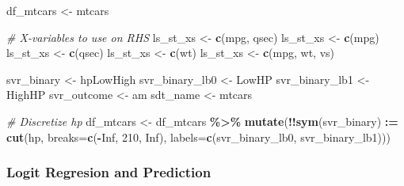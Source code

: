\documentclass[
]{book}
\newenvironment{Shaded}{\begin{snugshade}}{\end{snugshade}}
\newcommand{\CommentTok}[1]{\textcolor[rgb]{0.56,0.35,0.01}{\textit{#1}}}
\newcommand{\DataTypeTok}[1]{\textcolor[rgb]{0.13,0.29,0.53}{#1}}
\newcommand{\DecValTok}[1]{\textcolor[rgb]{0.00,0.00,0.81}{#1}}
\newcommand{\ErrorTok}[1]{\textcolor[rgb]{0.64,0.00,0.00}{\textbf{#1}}}
\newcommand{\KeywordTok}[1]{\textcolor[rgb]{0.13,0.29,0.53}{\textbf{#1}}}
\newcommand{\NormalTok}[1]{#1}
\newcommand{\OperatorTok}[1]{\textcolor[rgb]{0.81,0.36,0.00}{\textbf{#1}}}
\newcommand{\OtherTok}[1]{\textcolor[rgb]{0.56,0.35,0.01}{#1}}
\newcommand{\StringTok}[1]{\textcolor[rgb]{0.31,0.60,0.02}{#1}}
\begin{document}
\begin{Shaded}
\begin{Highlighting}[]
\NormalTok{df\_mtcars \textless{}{-}}\StringTok{ }\NormalTok{mtcars}

\CommentTok{\# X{-}variables to use on RHS}
\NormalTok{ls\_st\_xs \textless{}{-}}\StringTok{ }\KeywordTok{c}\NormalTok{(}\StringTok{\textquotesingle{}mpg\textquotesingle{}}\NormalTok{, }\StringTok{\textquotesingle{}qsec\textquotesingle{}}\NormalTok{)}
\NormalTok{ls\_st\_xs \textless{}{-}}\StringTok{ }\KeywordTok{c}\NormalTok{(}\StringTok{\textquotesingle{}mpg\textquotesingle{}}\NormalTok{)}
\NormalTok{ls\_st\_xs \textless{}{-}}\StringTok{ }\KeywordTok{c}\NormalTok{(}\StringTok{\textquotesingle{}qsec\textquotesingle{}}\NormalTok{)}
\NormalTok{ls\_st\_xs \textless{}{-}}\StringTok{ }\KeywordTok{c}\NormalTok{(}\StringTok{\textquotesingle{}wt\textquotesingle{}}\NormalTok{)}
\NormalTok{ls\_st\_xs \textless{}{-}}\StringTok{ }\KeywordTok{c}\NormalTok{(}\StringTok{\textquotesingle{}mpg\textquotesingle{}}\NormalTok{, }\StringTok{\textquotesingle{}wt\textquotesingle{}}\NormalTok{, }\StringTok{\textquotesingle{}vs\textquotesingle{}}\NormalTok{)}

\NormalTok{svr\_binary \textless{}{-}}\StringTok{ \textquotesingle{}hpLowHigh\textquotesingle{}}
\NormalTok{svr\_binary\_lb0 \textless{}{-}}\StringTok{ \textquotesingle{}LowHP\textquotesingle{}}
\NormalTok{svr\_binary\_lb1 \textless{}{-}}\StringTok{ \textquotesingle{}HighHP\textquotesingle{}}
\NormalTok{svr\_outcome \textless{}{-}}\StringTok{ \textquotesingle{}am\textquotesingle{}}
\NormalTok{sdt\_name \textless{}{-}}\StringTok{ \textquotesingle{}mtcars\textquotesingle{}}

\CommentTok{\# Discretize hp}
\NormalTok{df\_mtcars \textless{}{-}}\StringTok{ }\NormalTok{df\_mtcars }\OperatorTok{\%\textgreater{}\%}
\StringTok{    }\KeywordTok{mutate}\NormalTok{(}\OperatorTok{!!}\KeywordTok{sym}\NormalTok{(svr\_binary) }\OperatorTok{:}\ErrorTok{=}\StringTok{ }\KeywordTok{cut}\NormalTok{(hp,}
                           \DataTypeTok{breaks=}\KeywordTok{c}\NormalTok{(}\OperatorTok{{-}}\OtherTok{Inf}\NormalTok{, }\DecValTok{210}\NormalTok{, }\OtherTok{Inf}\NormalTok{),}
                           \DataTypeTok{labels=}\KeywordTok{c}\NormalTok{(svr\_binary\_lb0, svr\_binary\_lb1)))}
\end{Highlighting}
\end{Shaded}

\hypertarget{logit-regresion-and-prediction}{%
\subsubsection{Logit Regresion and Prediction}\label{logit-regresion-and-prediction}}
\end{document}
